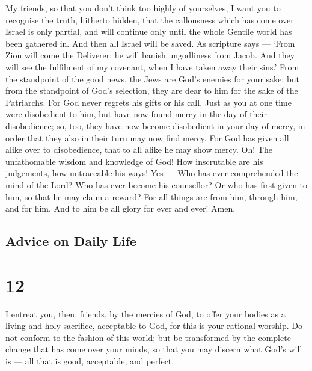  My friends, so that you don't think too highly of
yourselves, I want you to recognise the truth, hitherto hidden, that the
callousness which has come over Israel is only partial, and will
continue only until the whole Gentile world has been gathered in.
 And then all Israel will be saved. As scripture says ---
`From Zion will come the Deliverer; he will banish ungodliness from
Jacob.  And they will see the fulfilment of my covenant,
when I have taken away their sins.'  From the standpoint of
the good news, the Jews are God's enemies for your sake; but from the
standpoint of God's selection, they are dear to him for the sake of the
Patriarchs.  For God never regrets his gifts or his call.
 Just as you at one time were disobedient to him, but have
now found mercy in the day of their disobedience;  so, too,
they have now become disobedient in your day of mercy, in order that
they also in their turn may now find mercy.  For God has
given all alike over to disobedience, that to all alike he may show
mercy.  Oh! The unfathomable wisdom and knowledge of God!
How inscrutable are his judgements, how untraceable his ways! Yes ---
 Who has ever comprehended the mind of the Lord? Who has
ever become his counsellor?  Or who has first given to him,
so that he may claim a reward?  For all things are from
him, through him, and for him. And to him be all glory for ever and
ever! Amen.

\hypertarget{advice-on-daily-life}{%
\subsection{Advice on Daily Life}\label{advice-on-daily-life}}

\hypertarget{section-11}{%
\section{12}\label{section-11}}

 I entreat you, then, friends, by the mercies of God, to
offer your bodies as a living and holy sacrifice, acceptable to God, for
this is your rational worship.  Do not conform to the
fashion of this world; but be transformed by the complete change that
has come over your minds, so that you may discern what God's will is ---
all that is good, acceptable, and perfect.

